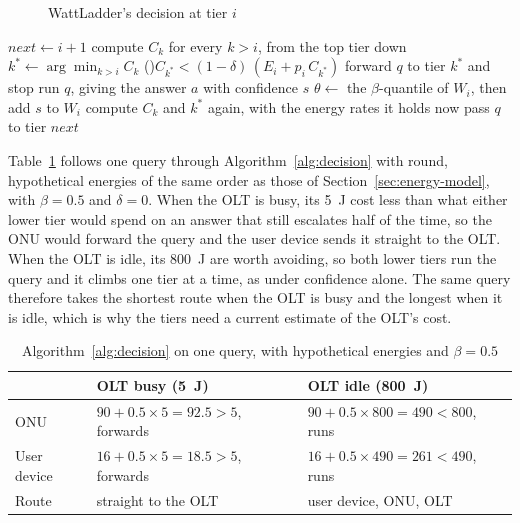\documentclass[cic,dipl,english]{infufrgs}
\begin{document}
\begin{figure}[htb]
  \centering
  \caption{WattLadder's decision at tier $i$}
  \label{fig:decision}
  \vspace{6pt}
  
  \vspace{4pt}
\end{figure}

\begin{algorithm}[htb]
  \caption{The decision of tier $i < J$ on a query $q$}
  \label{alg:decision}
  $\mathit{next} \leftarrow i+1$\;
  compute $C_k$ for every $k > i$, from the top tier
  down
  $k^* \leftarrow \arg\min_{k>i} C_k$\;
  \If(){$C_{k^*} < (1-\delta)\,(E_i + p_i\,C_{k^*})$}{
    forward $q$ to tier $k^*$ and stop\;
  }
  run $q$, giving the answer $a$ with confidence $s$\;
  $\theta \leftarrow$ the $\beta$-quantile of $W_i$, then add $s$ to $W_i$\;
  compute $C_k$ and $k^*$ again, with the energy rates it holds now\;
  pass $q$ to tier $\mathit{next}$\;
\end{algorithm}

Table~\ref{tab:example} follows one query through Algorithm~\ref{alg:decision} with
round, hypothetical energies of the same order as those of
Section~\ref{sec:energy-model}, with $\beta = 0.5$ and $\delta = 0$. When the OLT is
busy, its 5~J cost less than what either lower tier would spend on an answer that still
escalates half of the time, so the ONU would forward the query and the user device sends
it straight to the OLT. When the OLT is idle, its 800~J are worth avoiding, so both lower
tiers run the query and it climbs one tier at a time, as under confidence alone. The same
query therefore takes the shortest route when the OLT is busy and the longest when it is
idle, which is why the tiers need a current estimate of the OLT's cost.

\begin{table}[htb]
  \centering
  \caption{Algorithm~\ref{alg:decision} on one query, with hypothetical energies and
  $\beta = 0.5$}
  \label{tab:example}
  \begin{tabular}{lll}
    \toprule
    & OLT busy (5~J) & OLT idle (800~J) \\
    \midrule
    ONU & $90 + 0.5 \times 5 = 92.5 > 5$, forwards & $90 + 0.5 \times 800 = 490 < 800$, runs \\
    User device & $16 + 0.5 \times 5 = 18.5 > 5$, forwards & $16 + 0.5 \times 490 = 261 < 490$, runs \\
    Route & straight to the OLT & user device, ONU, OLT \\
    \bottomrule
  \end{tabular}
\end{table}
\end{document}
